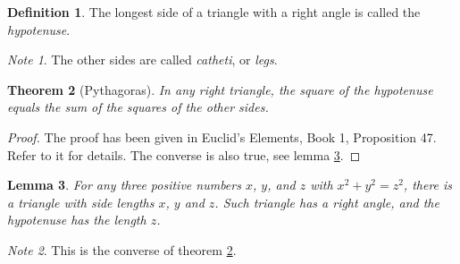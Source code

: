 \documentclass{article}
\newtheorem{thm}{Theorem}
\newtheorem{lem}[thm]{Lemma}
\theoremstyle{definition}
\newtheorem{dfn}[thm]{Definition}
\theoremstyle{remark}
\newtheorem*{note}{Note}
\begin{document}
\listoftheorems
\newpage
\begin{dfn}
  The longest side of a triangle with a right angle
  is called the \emph{hypotenuse}.
\end{dfn}
\begin{note}
  The other sides are called \emph{catheti},
  or \emph{legs}.
\end{note}
\begin{thm}[Pythagoras]
  \label{pythagoras}
  In any right triangle, the square of the hypotenuse
  equals the sum of the squares of the other sides.
\end{thm}
\begin{proof}
  The proof has been given in Euclid's Elements,
  Book 1, Proposition 47. Refer to it for details.
  The converse is also true, see lemma \ref{converse}.
\end{proof}
\begin{lem}
  \label{converse}
  For any three positive numbers \(x\), \(y\),
  and \(z\) with \(x^2 + y^2 = z^2\), there is a
  triangle with side lengths \(x\), \(y\) and \(z\).
  Such triangle has a right angle, and the hypotenuse
  has the length \(z\).
\end{lem}
\begin{note}
  This is the converse of theorem \ref{pythagoras}.
\end{note}
\end{document}
